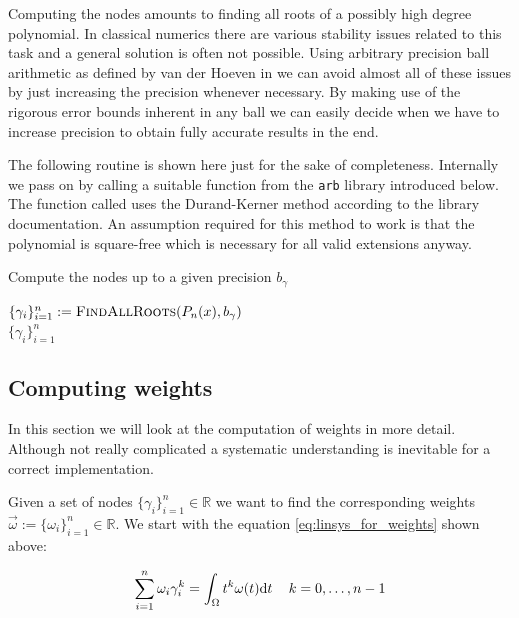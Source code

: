 \documentclass[a4paper,10pt]{article}
\begin{document}
Computing the nodes amounts to finding all roots of a possibly high degree
polynomial. In classical numerics there are various stability issues related
to this task and a general solution is often not possible. Using arbitrary precision
ball arithmetic as defined by van der Hoeven in \cite{vdH:ball:greifswald, vdH:ball}
we can avoid almost all of these issues by just increasing the precision
whenever necessary. By making use of the rigorous error bounds inherent in any ball
we can easily decide when we have to increase precision to obtain fully accurate
results in the end.

The following routine is shown here just for the sake of completeness. Internally
we pass on by calling a suitable function from the \texttt{arb} library introduced below.
The function called uses the Durand-Kerner method according to the library documentation.
An assumption required for this method to work is that the polynomial is square-free
which is necessary for all valid extensions anyway.

\begin{algorithm}
  \caption{Compute the nodes up to a given precision $b_{\gamma}$}
  \begin{algorithmic}
    \State $\{\gamma_i\}_{i=1}^{n} := \textsc{FindAllRoots}(P_n(x), b_{\gamma})$ \\
    \Return $\{\gamma_i\}_{i=1}^{n}$
    \EndProcedure
  \end{algorithmic}
\end{algorithm}


\subsection{Computing weights}

In this section we will look at the computation of weights in more detail.
Although not really complicated a systematic understanding is inevitable for
a correct implementation.

Given a set of nodes $\{\gamma_i\}_{i=1}^{n} \in \mathbb{R}$ we want
to find the corresponding weights $\vec{\omega} := \{\omega_i\}_{i=1}^{n} \in \mathbb{R}$.
We start with the equation \eqref{eq:linsys_for_weights} shown above:

\begin{equation}
  \sum_{i=1}^{n} \omega_i \gamma_i^k = \int_{\Omega} t^k \omega(t) \mathrm{d}t \,
  \quad k = 0, \ldots, n-1
\end{equation}
\end{document}
